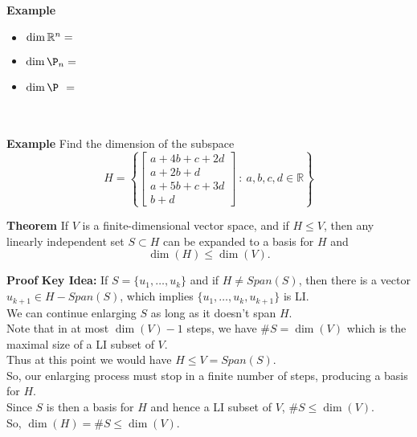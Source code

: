  \begin{frame}[fragile]
\textbf{Example}
\begin{itemize}
\item[] $\dim \mathbb R^n = \textbf{\hspace{10mm}} $
\item[] $\dim \P_n  = \textbf{\hspace{10mm}}$
\item[] $\dim \P_{\mbox{ }} = \textbf{\hspace{10mm}}$
\end{itemize}
\  \\  \  \\




\textbf{Example}
Find the dimension of the subspace 
\[
H = 
\left\{
\left[ \begin{array}{rrrrr}
a+4b+c+2d \\
a+2b +d\\
a+5b+c+3d\\
b+d      
\end{array} \right]\ 
: \ a,b,c,d \in \mathbb R \right\}
\]

\end{frame}






 \begin{frame}[fragile]
\textbf{Theorem}
If $V$ is a finite-dimensional vector space, and if $H\le V$, then any linearly 
independent set $S \subset H$ can be expanded to a basis for $H$ and 
\[
\dim(H) \leq \dim (V).
\]


\end{frame}


 \begin{frame}[fragile]

\textbf{Proof}
{\bf Key Idea:} If $S= \{{u}_1, \dots, {u}_k \}$ and
if $H\neq Span(S)$, then there is a vector ${u}_{k+1}\in H -Span(S)$,
which implies $\{{u}_1, \dots, {u}_k,{u}_{k+1} \}$ is LI.    \\ 
We can continue enlarging $S$ as long as it doesn't span $H$.  \\ 
Note that in at most $\dim(V)  -1$ steps, we have $\#S =\dim(V)$ which is the maximal size of a LI subset of $V$. \\ 
Thus at this point we would have $H\le V=Span(S)$.  \\ 
So, our enlarging process must stop in a finite number of steps, producing a basis for $H$.  \\ 
Since $S$ is then a basis for $H$ and hence a LI subset of $V$,  $\#S\le \dim(V)$.   \\
So, $\dim(H) = \#S \leq \dim(V)$.

\end{frame}




